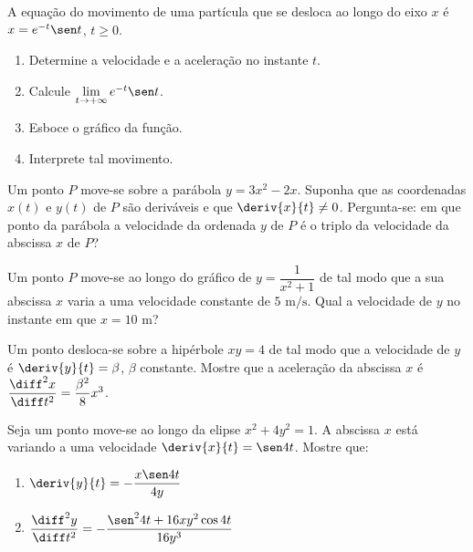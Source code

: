 \begin{exercicio}[10]
\label{ex:7.15.10}
A equação do movimento de uma partícula que se desloca ao longo do eixo $x$ é $x = e^{-t}\sen t$, $t \ge 0$.
\begin{enumerate}[label=\alph*)]
    \item Determine a velocidade e a aceleração no instante $t$.
    \item Calcule $\lim\limits_{t \to +\infty} e^{-t}\sen t$.
    \item Esboce o gráfico da função.
    \item Interprete tal movimento.
\end{enumerate}
\end{exercicio}

\begin{exercicio}[11]
\label{ex:7.15.11}
Um ponto $P$ move-se sobre a parábola $y = 3x^2 - 2x$. Suponha que as coordenadas $x(t)$ e $y(t)$ de $P$ são deriváveis e que $\deriv{x}{t} \neq 0$. Pergunta-se: em que ponto da parábola a velocidade da ordenada $y$ de $P$ é o triplo da velocidade da abscissa $x$ de $P$?
\end{exercicio}

\begin{exercicio}[12]
\label{ex:7.15.12}
Um ponto $P$ move-se ao longo do gráfico de $y = \dfrac{1}{x^2 + 1}$ de tal modo que a sua abscissa $x$ varia a uma velocidade constante de $5\text{ m/s}$. Qual a velocidade de $y$ no instante em que $x = 10\text{ m}$?
\end{exercicio}

\begin{exercicio}[13]
\label{ex:7.15.13}
Um ponto desloca-se sobre a hipérbole $xy = 4$ de tal modo que a velocidade de $y$ é $\deriv{y}{t} = \beta$, $\beta$ constante. Mostre que a aceleração da abscissa $x$ é $\dfrac{\diff^2x}{\diff t^2} = \dfrac{\beta^2}{8}x^3$.
\end{exercicio}

\begin{exercicio}[14]
\label{ex:7.15.14}
Seja um ponto move-se ao longo da elipse $x^2 + 4y^2 = 1$. A abscissa $x$ está variando a uma velocidade $\deriv{x}{t} = \sen 4t$. Mostre que:
\begin{enumerate}[label=\alph*)]
    \item $\deriv{y}{t} = -\dfrac{x\sen 4t}{4y}$
    \item $\dfrac{\diff^2y}{\diff t^2} = -\dfrac{\sen^2 4t + 16xy^2 \cos 4t}{16y^3}$
\end{enumerate}
\end{exercicio}


